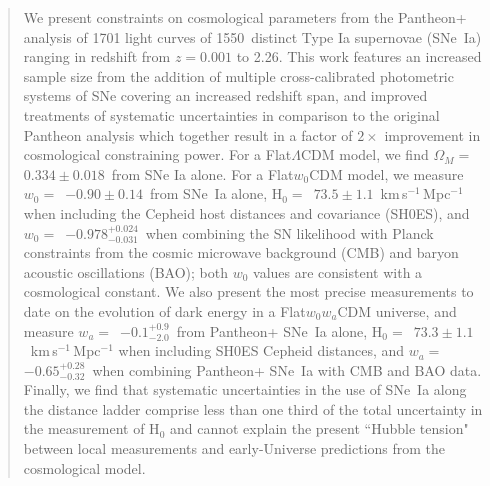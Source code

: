 \documentclass[twocolumn]{aastex63}
\def\fLCDMOMPan{$0.334\pm0.018$}
\def\wPanSH{$-0.90\pm 0.14$}
\def\HPanSH{$73.5\pm1.1$}
\def\wPanPlanckBAO{$-0.978^{+0.024}_{-0.031}$}
\def\wwawaPan{$-0.1^{+0.9}_{-2.0}$}
\def\wwaHPanSH{$73.3\pm1.1$}
\def\wwawaPanPlanckBAO{$-0.65^{+0.28}_{-0.32}$}
\def\nunique{1550}
\begin{document}
\author{Masao Sako}

\author{Matthew R.\ Siebert}

\author{Mat Smith}

\author{Benjamin E.\ Stahl}

\author{Phil Wiseman}




\vspace{8mm}
\begin{abstract}

We present constraints on cosmological parameters from the Pantheon+ analysis of 1701 light curves of \nunique\ distinct Type Ia supernovae (SNe~Ia) ranging in redshift from $z=0.001$ to 2.26. This work features an increased sample size from the addition of multiple cross-calibrated photometric systems of SNe covering an increased redshift span, and improved treatments of systematic uncertainties in comparison to the original Pantheon analysis which together result in a factor of $2\times$ improvement in cosmological constraining power. For a Flat$\Lambda$CDM model, we find $\Omega_M=$~\fLCDMOMPan\ from SNe Ia alone. For a Flat$w_0$CDM model, we measure $w_0=$~\wPanSH\ from SNe~Ia alone, H$_0=$~\HPanSH~{km\,s$^{-1}$\,Mpc$^{-1}$} when including the Cepheid host distances and covariance (SH0ES), and $w_0=$~\wPanPlanckBAO\ when combining the SN likelihood with Planck constraints from the cosmic microwave background (CMB) and baryon acoustic oscillations (BAO); both $w_0$ values are consistent with a cosmological constant. We also present the most precise measurements to date on the evolution of dark energy in a Flat$w_0w_a$CDM universe, and measure $w_a=$~\wwawaPan\ from Pantheon+ SNe~Ia alone, H$_0=$~\wwaHPanSH~{km\,s$^{-1}$\,Mpc$^{-1}$} when including SH0ES Cepheid distances, and $w_a=$~\wwawaPanPlanckBAO\ when combining Pantheon+ SNe~Ia with CMB and BAO data. Finally, we find that systematic uncertainties in the use of SNe~Ia along the distance ladder comprise {less than} one third of the total uncertainty in the measurement of H$_0$ and cannot explain the present ``Hubble tension" between local measurements and early-Universe predictions from the cosmological model. 


\end{abstract}
\end{document}
